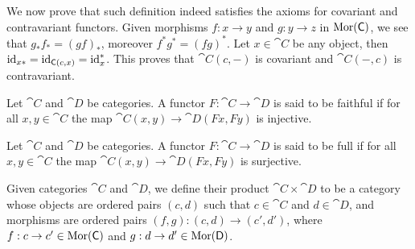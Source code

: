 We now prove that such definition indeed satisfies the axioms for covariant and
contravariant functors. Given morphisms \(f: x \to y\) and \(g: y \to z\) in
\(\operatorname{Mor}(\mathsf C)\), we see that \(g_* f_* = (g f)_*\), moreover \(f^* g^* = (f
g)^*\). Let \(x \in \cat C\) be any object, then \(\operatorname{id}_{x *} = \operatorname{id}_{\mathsf C(c,
x)} = \operatorname{id}_x^*\). This proves that \(\cat C(c, -)\) is covariant and \(\cat C(-,
c)\) is contravariant.

\begin{definition}[Faithful]\label{def: faithful}
  Let \(\cat C\) and \(\cat D\) be categories. A functor \(F: \cat C \to \cat
  D\) is said to be faithful if for all \(x, y \in \cat C\) the map \(\cat C(x,
  y) \to \cat D(F x, F y)\) is injective.
\end{definition}

\begin{definition}[Full]\label{def: full}
  Let \(\cat C\) and \(\cat D\) be categories. A functor \(F: \cat C \to \cat
  D\) is said to be full if for all \(x, y \in \cat C\) the map \(\cat C(x,
  y) \to \cat D(F x, F y)\) is surjective.
\end{definition}

\begin{definition}
  Given categories \(\cat C\) and \(\cat D\), we define their product \(\cat C
  \times \cat D\) to be a category whose objects are ordered pairs \((c, d)\) 
  such that \(c \in \cat C\) and \(d \in \cat D\), and morphisms are ordered
  pairs \((f, g): (c, d) \to (c', d')\), where \(f: c \to c' \in \operatorname{Mor}(\mathsf C)\) 
  and \(g: d \to d' \in \operatorname{Mor}(\mathsf D)\).
\end{definition}



